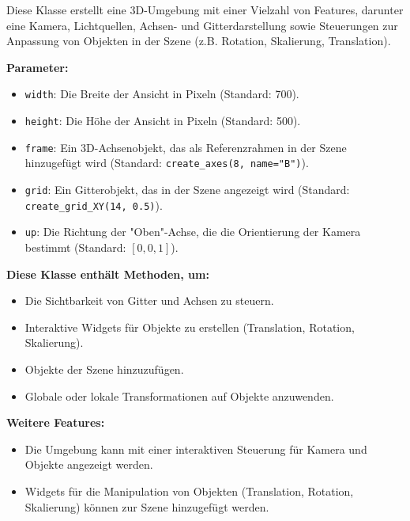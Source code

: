 Diese Klasse erstellt eine 3D-Umgebung mit einer Vielzahl von Features, darunter eine Kamera, Lichtquellen, Achsen- und Gitterdarstellung sowie Steuerungen zur Anpassung von Objekten in der Szene (z.B. Rotation, Skalierung, Translation).

\noindent \textbf{Parameter:} \vspace{-6ex} \\
\begin{itemize}
    \setlength{\itemindent}{1em}  %
    \item \texttt{width}: Die Breite der Ansicht in Pixeln (Standard: 700).
    \item \texttt{height}: Die Höhe der Ansicht in Pixeln (Standard: 500).
    \item \texttt{frame}: Ein 3D-Achsenobjekt, das als Referenzrahmen in der Szene hinzugefügt wird (Standard: \texttt{create\_axes(8, name="B")}).
    \item \texttt{grid}: Ein Gitterobjekt, das in der Szene an\-ge\-zeigt wird (Stan\-dard: \\ \texttt{create\_grid\_XY(14, 0.5)}).
    \item \texttt{up}: Die Richtung der "Oben"-Achse, die die Orientierung der Kamera bestimmt (Standard: \([0, 0, 1]\)).
\end{itemize}

\noindent \textbf{Diese Klasse enthält Methoden, um:} \vspace{-6ex} \\
\begin{itemize}
    \setlength{\itemindent}{1em}
    \item Die Sichtbarkeit von Gitter und Achsen zu steuern.
    \item Interaktive Widgets für Objekte zu erstellen (Translation, Rotation, Skalierung).
    \item Objekte der Szene hinzuzufügen.
    \item Globale oder lokale Transformationen auf Objekte anzuwenden.
\end{itemize}

\noindent \textbf{Weitere Features:} \vspace{-6ex} \\
\begin{itemize}
    \setlength{\itemindent}{1em}
    \item Die Umgebung kann mit einer interaktiven Steuerung für Kamera und Objekte angezeigt werden.
    \item Widgets für die Manipulation von Objekten (Translation, Rotation, Skalierung) können zur Szene hinzugefügt werden.
\end{itemize}

